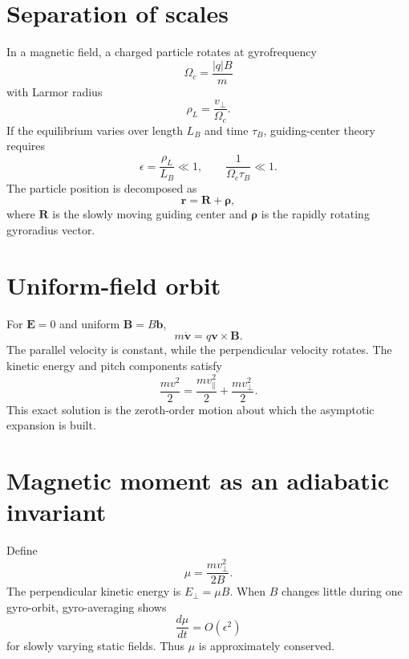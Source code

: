 \documentclass[11pt]{article}
\begin{document}
\section{Separation of scales}
In a magnetic field, a charged particle rotates at gyrofrequency
\begin{equation}
\Omega_c=\frac{|q|B}{m}
\end{equation}
with Larmor radius
\begin{equation}
\rho_L=\frac{v_\perp}{\Omega_c}.
\end{equation}
If the equilibrium varies over length $L_B$ and time $\tau_B$, guiding-center theory requires
\begin{equation}
\epsilon=\frac{\rho_L}{L_B}\ll1,
\qquad
\frac{1}{\Omega_c\tau_B}\ll1.
\end{equation}
The particle position is decomposed as
\begin{equation}
\mathbf r=\mathbf R+\boldsymbol\rho,
\end{equation}
where $\mathbf R$ is the slowly moving guiding center and $\boldsymbol\rho$ is the rapidly rotating gyroradius vector.

\section{Uniform-field orbit}
For $\mathbf E=0$ and uniform $\mathbf B=B\mathbf b$,
\begin{equation}
m\dot{\mathbf v}=q\mathbf v\times\mathbf B.
\end{equation}
The parallel velocity is constant, while the perpendicular velocity rotates. The kinetic energy and pitch components satisfy
\begin{equation}
\frac{mv^2}{2}=\frac{mv_\parallel^2}{2}+\frac{mv_\perp^2}{2}.
\end{equation}
This exact solution is the zeroth-order motion about which the asymptotic expansion is built.

\section{Magnetic moment as an adiabatic invariant}
Define
\begin{equation}
\boxed{\mu=\frac{mv_\perp^2}{2B}}.
\end{equation}
The perpendicular kinetic energy is $E_\perp=\mu B$. When $B$ changes little during one gyro-orbit, gyro-averaging shows
\begin{equation}
\frac{d\mu}{dt}=O(\epsilon^2)
\end{equation}
for slowly varying static fields. Thus $\mu$ is approximately conserved.
\end{document}
